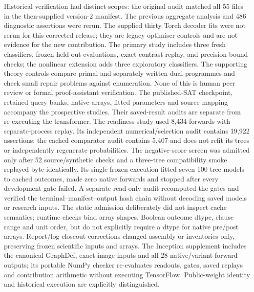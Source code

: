 \documentclass[
  british,
  11pt,
  a4paper,
]{article}
\begin{document}
Historical verification had distinct scopes: the original audit matched
all 55 files in the then-supplied version-2 manifest. The previous
aggregate analysis and 486 diagnostic assertions were rerun. The
supplied thirty Torch decoder fits were not rerun for this corrected
release; they are legacy optimiser controls and are not evidence for the
new contribution. The primary study includes three fresh classifiers,
frozen held-out evaluations, exact contrast replay, and precision-bound
checks; the nonlinear extension adds three exploratory classifiers. The
supporting theory controls compare primal and separately written dual
programmes and check small repair problems against enumeration. None of
this is human peer review or formal proof-assistant verification. The
published-SAT checkpoint, retained query banks, native arrays, fitted
parameters and source mapping accompany the prospective studies. Their
saved-result audits are separate from re-executing the transformer. The
readiness study used 8,434 forwards with separate-process replay. Its
independent numerical/selection audit contains 19,922 assertions; the
cached comparator audit contains 5,407 and does not refit its trees or
independently regenerate probabilities. The negative-score screen was
admitted only after 52 source/synthetic checks and a three-tree
compatibility smoke replayed byte-identically. Its single frozen
execution fitted seven 100-tree models to cached outcomes, made zero
native forwards and stopped after every development gate failed. A
separate read-only audit recomputed the gates and verified the
terminal--manifest--output hash chain without decoding saved models or
research inputs. The static admission deliberately did not inspect cache
semantics; runtime checks bind array shapes, Boolean outcome dtype,
clause range and unit order, but do not explicitly require a dtype for
native pre/post arrays. Report/log closeout corrections changed assembly
or inventories only, preserving frozen scientific inputs and arrays. The
Inception supplement includes the canonical GraphDef, exact image inputs
and all 28 native/variant forward outputs; its portable NumPy checker
re-evaluates readouts, gates, saved replays and contribution arithmetic
without executing TensorFlow. Public-weight identity and historical
execution are explicitly distinguished.
\end{document}
